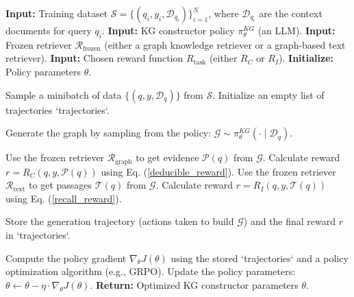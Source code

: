 \documentclass[11pt]{article}
\begin{document}
\begin{algorithm*}[b!]
\caption{AutoGraph-R1 Training Loop}
\label{alg:autograph}
\begin{algorithmic}[1]
\State \textbf{Input:} Training dataset $\mathcal{S} = \{(q_i, y_i, \mathcal{D}_{q_i})\}_{i=1}^N$, where $\mathcal{D}_{q_i}$ are the context documents for query $q_i$.
\State \textbf{Input:} KG constructor policy $\pi_{\theta}^{KG}$ (an LLM).
\State \textbf{Input:} Frozen retriever $\mathcal{R}_{\text{frozen}}$ (either a graph knowledge retriever or a graph-based text retriever).
\State \textbf{Input:} Chosen reward function $R_{\text{task}}$ (either $R_C$ or $R_I$).
\State \textbf{Initialize:} Policy parameters $\theta$.

    \State Sample a minibatch of data $\{(q, y, \mathcal{D}_q)\}$ from $\mathcal{S}$.
    \State Initialize an empty list of trajectories `trajectories`.

        \State {}
        \State Generate the graph by sampling from the policy: $\mathcal{G} \sim \pi_{\theta}^{KG}(\cdot \mid \mathcal{D}_q)$.
        
        \State {}
            \State Use the frozen retriever $\mathcal{R}_{\text{graph}}$ to get evidence $\mathcal{P}(q)$ from $\mathcal{G}$.
            \State Calculate reward $r = R_C(q, y, \mathcal{P}(q))$ using Eq. (\ref{deducible_reward}).
            \State Use the frozen retriever $\mathcal{R}_{\text{text}}$ to get passages $\mathcal{T}(q)$ from $\mathcal{G}$.
            \State Calculate reward $r = R_I(q, y, \mathcal{T}(q))$ using Eq. (\ref{recall_reward}).
        \EndIf
        
        \State Store the generation trajectory (actions taken to build $\mathcal{G}$) and the final reward $r$ in `trajectories`.
    \EndFor

    \State {}
    \State Compute the policy gradient $\nabla_{\theta} J(\theta)$ using the stored `trajectories` and a policy optimization algorithm (e.g., GRPO).
    \State Update the policy parameters: $\theta \leftarrow \theta - \eta \cdot \nabla_{\theta} J(\theta)$.
\EndFor
\State \textbf{Return:} Optimized KG constructor parameters $\theta$.
\end{algorithmic}
\end{algorithm*}
\end{document}
